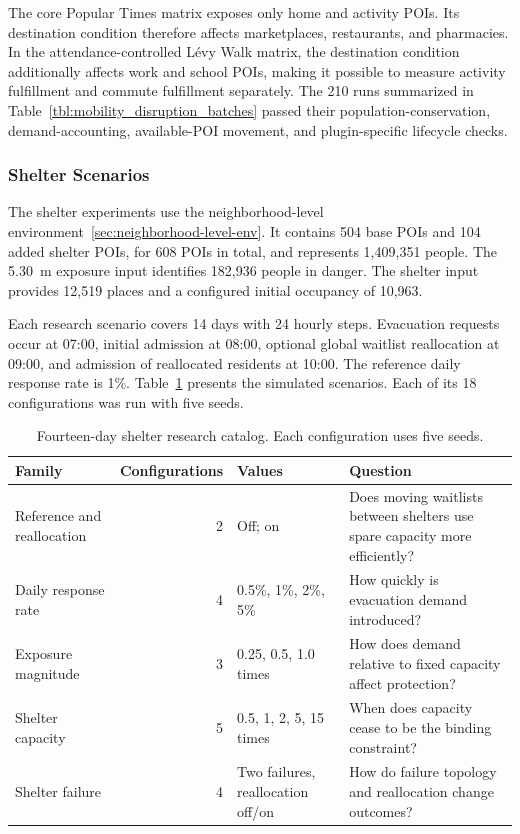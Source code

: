 The core Popular Times matrix exposes only home and activity POIs. Its destination condition therefore affects marketplaces, restaurants, and pharmacies. In the attendance-controlled L\'evy Walk matrix, the destination condition additionally affects work and school POIs, making it possible to measure activity fulfillment and commute fulfillment separately. The 210 runs summarized in Table~\ref{tbl:mobility_disruption_batches} passed their population-conservation, demand-accounting, available-POI movement, and plugin-specific lifecycle checks.

\subsubsection{Shelter Scenarios}

The shelter experiments use the neighborhood-level environment~\ref{sec:neighborhood-level-env}. It contains 504 base POIs and 104 added shelter POIs, for 608 POIs in total, and represents 1,409,351 people. The 5.30~m exposure input identifies 182,936 people in danger. The shelter input provides 12,519 places and a configured initial occupancy of 10,963.


Each research scenario covers 14 days with 24 hourly steps. Evacuation requests occur at 07:00, initial admission at 08:00, optional global waitlist reallocation at 09:00, and admission of reallocated residents at 10:00. The reference daily response rate is 1\%. Table~\ref{tbl:shelter_scenario_families} presents the simulated scenarios. Each of its 18 configurations was run with five seeds.

\begin{table}[ht]
\centering
\footnotesize
\caption{Fourteen-day shelter research catalog. Each configuration uses five seeds.}
\label{tbl:shelter_scenario_families}
\begin{tabularx}{\linewidth}{@{}lrlX@{}}
\toprule
\textbf{Family} & \textbf{Configurations} & \textbf{Values} & \textbf{Question} \\
\midrule
Reference and reallocation & 2 & Off; on & Does moving waitlists between shelters use spare capacity more efficiently? \\
Daily response rate & 4 & 0.5\%, 1\%, 2\%, 5\% & How quickly is evacuation demand introduced? \\
Exposure magnitude & 3 & 0.25, 0.5, 1.0 times & How does demand relative to fixed capacity affect protection? \\
Shelter capacity & 5 & 0.5, 1, 2, 5, 15 times & When does capacity cease to be the binding constraint? \\
Shelter failure & 4 & Two failures, reallocation off/on & How do failure topology and reallocation change outcomes? \\
\bottomrule
\end{tabularx}
\end{table}

